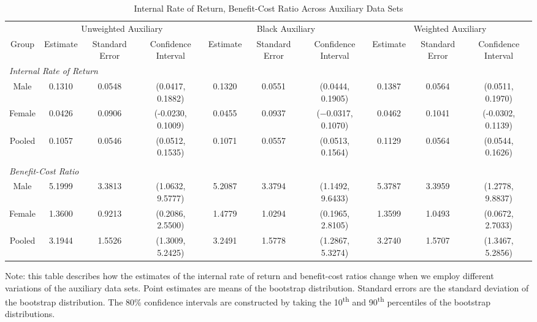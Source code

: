 \begin{sidewaystable}[H]
\footnotesize
\begin{threeparttable}
\caption{Internal Rate of Return, Benefit-Cost Ratio Across Auxiliary Data Sets}
\label{tab:irrbcr_aux_compare}
\begin{tabular}{cccc|ccc|ccc}
\hline\hline
& \multicolumn{3}{c|}{Unweighted Auxiliary} & \multicolumn{3}{c|}{Black Auxiliary} & \multicolumn{3}{c}{Weighted Auxiliary} \\
Group & Estimate & Standard Error & Confidence Interval & Estimate & Standard Error & Confidence Interval & Estimate & Standard Error & Confidence Interval \\
\hline
\multicolumn{4}{l|}{\emph{Internal Rate of Return}} & & & & & & \\
Male & 0.1310 & 0.0548 & (0.0417, 0.1882)  & 0.1320 & 0.0551 & (0.0444, 0.1905) & 0.1387 & 0.0564 & (0.0511, 0.1970) \\
Female & 0.0426 & 0.0906 & (-0.0230, 0.1009) & 0.0455 & 0.0937 & ($-$0.0317, 0.1070) & 0.0462 & 0.1041 & (-0.0302, 0.1139)  \\
Pooled & 0.1057 & 0.0546 & (0.0512, 0.1535) & 0.1071 & 0.0557 & (0.0513, 0.1564) &  0.1129 & 0.0564 & (0.0544, 0.1626)  \\
& & & & & & & & & \\
\multicolumn{4}{l|}{\emph{Benefit-Cost Ratio}} & & & & & & \\
Male & 5.1999 & 3.3813 & (1.0632, 9.5777) & 5.2087 & 3.3794 & (1.1492, 9.6433) & 5.3787 & 3.3959 & (1.2778, 9.8837) \\
Female & 1.3600 & 0.9213 & (0.2086, 2.5500) & 1.4779 & 1.0294 & (0.1965, 2.8105) & 1.3599 & 1.0493 & (0.0672, 2.7033)  \\ 
Pooled & 3.1944 & 1.5526 & (1.3009, 5.2425) & 3.2491 & 1.5778 & (1.2867, 5.3274) & 3.2740 & 1.5707 & (1.3467, 5.2856)  \\
\hline\hline

\end{tabular}
\begin{tablenotes}
\footnotesize
\item Note: this table describes how the estimates of the internal rate of return
and benefit-cost ratios change when we employ different variations of the 
auxiliary data sets. Point estimates are means of the bootstrap distribution. Standard
errors are the standard deviation of the bootstrap distribution. The 80\%
confidence intervals are constructed by taking the 10\textsuperscript{th} and 
90\textsuperscript{th} percentiles of the bootstrap distributions. 
\end{tablenotes}
\end{threeparttable}
\end{sidewaystable}
